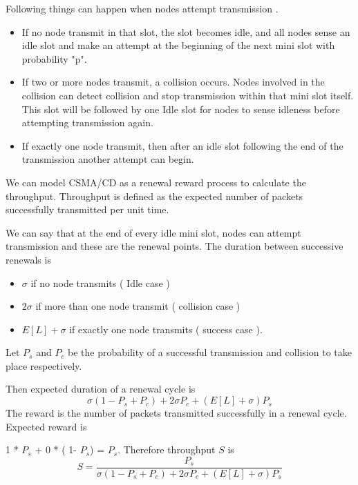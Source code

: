 Following things can happen when nodes attempt transmission .
\begin{itemize}
\item If no node transmit in that slot, the slot becomes idle, and all nodes sense an idle slot and make an attempt at the beginning of the next mini slot with probability "p".

\item If two or more nodes transmit, a collision occurs. Nodes involved in the collision can detect collision and stop transmission within that mini slot itself. This slot will be followed by one Idle slot for nodes to sense idleness before attempting transmission again.
\item If exactly one node transmit, then after an idle slot following the end of the transmission another attempt can begin.
\end{itemize}

We can model CSMA/CD as a renewal reward process to calculate the throughput. Throughput is defined as the expected number of packets successfully transmitted per unit time.

We can say that at the end of every idle mini slot, nodes can attempt transmission and these are the renewal points. The duration between successive renewals is 
\begin{itemize}
    \item $\sigma$ if no node transmits ( Idle case )
    \item $ 2 \sigma$ if more than one node transmit ( collision case )
    \item $E[L] + \sigma $ if exactly one node transmits ( success case ).
\end{itemize}

Let $P_{s}$ and $P_{c}$ be the probability of a successful transmission and collision to take place respectively.

Then expected duration of a renewal cycle is 
\begin{equation}
    \sigma ( 1- P_{s} + P_{c}  )   +  2 \sigma P_{c} + ( E[L] + \sigma )  P_{s}
\end{equation}
The  reward is the number of packets transmitted successfully in a renewal cycle. Expected reward is

1 * $P_{s}$ + 0 * ( 1- $P_{s}$) = $P_{s}$.
Therefore throughput $S$ is \begin{equation}
    S = \frac{P_{s}}{\sigma ( 1- P_{s} + P_{c}  )   +  2 \sigma P_{c} + ( E[L] + \sigma )  P_{s}}
\end{equation}

